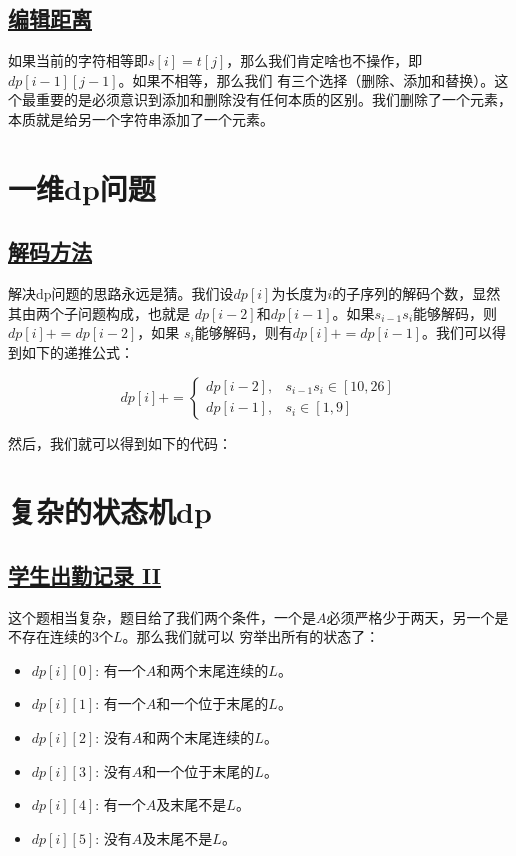 \documentclass[../../main.tex]{subfiles}
\begin{document}
\subsection{\href{https://leetcode.cn/problems/edit-distance/}{编辑距离}}

如果当前的字符相等即$s[i] = t[j]$，那么我们肯定啥也不操作，即$dp[i - 1][j -1]$。如果不相等，那么我们
有三个选择（删除、添加和替换）。这个最重要的是必须意识到添加和删除没有任何本质的区别。我们删除了一个元素，
本质就是给另一个字符串添加了一个元素。

\section{一维dp问题}

\subsection{\href{https://leetcode.cn/problems/decode-ways/}{解码方法}}

解决dp问题的思路永远是猜。我们设$dp[i]$为长度为$i$的子序列的解码个数，显然其由两个子问题构成，也就是
$dp[i - 2]$和$dp[i - 1]$。如果$s_{i -1}s_{i}$能够解码，则$dp[i] += dp[i - 2]$，如果
$s_{i}$能够解码，则有$dp[i] += dp[i - 1]$。我们可以得到如下的递推公式：

$$
dp[i] += \begin{cases}
  dp[i - 2], & s_{i - 1}s_{i} \in [10, 26] \\
  dp[i - 1], & s_{i} \in [1, 9]
\end{cases}
$$

然后，我们就可以得到如下的代码：



\section{复杂的状态机dp}

\subsection{\href{https://leetcode.cn/problems/student-attendance-record-ii/}{学生出勤记录 II}}

这个题相当复杂，题目给了我们两个条件，一个是$A$必须严格少于两天，另一个是不存在连续的3个$L$。那么我们就可以
穷举出所有的状态了：

\begin{itemize}
  \item $dp[i][0]$: 有一个$A$和两个末尾连续的$L$。
  \item $dp[i][1]$: 有一个$A$和一个位于末尾的$L$。
  \item $dp[i][2]$: 没有$A$和两个末尾连续的$L$。
  \item $dp[i][3]$: 没有$A$和一个位于末尾的$L$。
  \item $dp[i][4]$: 有一个$A$及末尾不是$L$。
  \item $dp[i][5]$: 没有$A$及末尾不是$L$。
\end{itemize}
\end{document}
